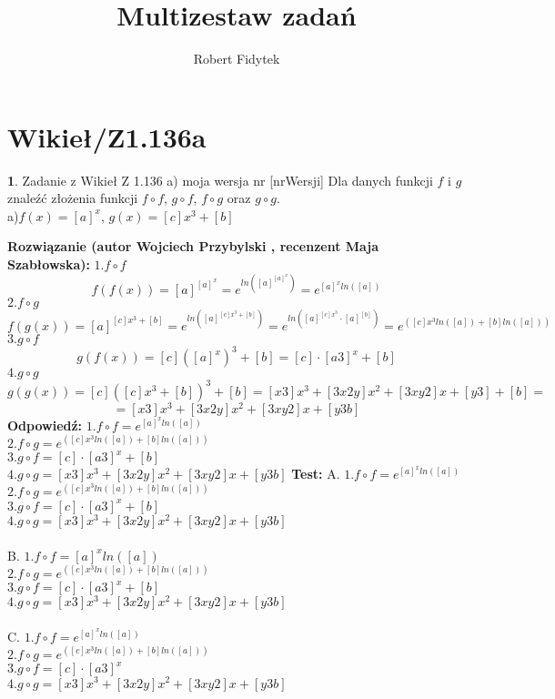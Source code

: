 \documentclass[12pt, a4paper]{article}
\title{Multizestaw zadań}
\author{Robert Fidytek}
\date{}
\theoremstyle{definition} %
\newtheorem{zad}{}
\newcommand{\kategoria}[1]{\section{#1}} %
\newcommand{\zadStart}[1]{\begin{zad}#1\newline} %
\newcommand{\zadStop}{\end{zad}}   %
\newcommand{\rozwStart}[2]{\noindent \textbf{Rozwiązanie (autor #1 , recenzent #2): }\newline} %
\newcommand{\rozwStop}{\newline}                                            %
\newcommand{\odpStart}{\noindent \textbf{Odpowiedź:}\newline}    %
\newcommand{\odpStop}{\newline}                                             %
\newcommand{\testStart}{\noindent \textbf{Test:}\newline} %
\begin{document}
\maketitle


\kategoria{Wikieł/Z1.136a}
\zadStart{Zadanie z Wikieł Z 1.136 a) moja wersja nr [nrWersji]}
Dla danych funkcji $f$ i $g$ znaleźć złożenia funkcji $f \circ f$, $g \circ f$, $f \circ g$ oraz $g \circ g$.\\
a)$f(x)=[a]^{x}$, $g(x)=[c]x^{3}+[b]$
\zadStop
\rozwStart{Wojciech Przybylski}{Maja Szabłowska}
$1. f \circ f$
$$f(f(x))=[a]^{[a]^{x}}=e^{ln([a]^{[a]^{x}})}=e^{[a]^{x}ln([a])}$$
$2. f \circ g$
$$f(g(x))=[a]^{[c]x^{3}+[b]}=e^{ln([a]^{[c]x^{3}+[b]})}=e^{ln([a]^{[c]x^{3}}\cdot[a]^{[b]})}=e^{([c]x^{3}ln([a])+[b]ln([a]))}$$
$3. g \circ f$
$$g(f(x))=[c]([a]^{x})^{3}+[b]=[c]\cdot[a3]^{x}+[b]$$
$4. g \circ g$
$$g(g(x))=[c]([c]x^{3}+[b])^{3}+[b]=[x3]x^{3}+[3x2y]x^{2}+[3xy2]x+[y3]+[b]=$$
$$=[x3]x^{3}+[3x2y]x^{2}+[3xy2]x+[y3b]$$
\rozwStop
\odpStart
$1. f \circ f = e^{[a]^{x}ln([a])}$\\
$2. f \circ g = e^{([c]x^{3}ln([a])+[b]ln([a]))}$\\
$3. g \circ f = [c]\cdot[a3]^{x}+[b]$\\
$4. g \circ g =[x3]x^{3}+[3x2y]x^{2}+[3xy2]x+[y3b] $
\odpStop
\testStart
A. $1. f \circ f = e^{[a]^{x}ln([a])}$\\
$2. f \circ g = e^{([c]x^{3}ln([a])+[b]ln([a]))}$\\
$3. g \circ f = [c]\cdot[a3]^{x}+[b]$\\
$4. g \circ g =[x3]x^{3}+[3x2y]x^{2}+[3xy2]x+[y3b] $\\
\\
B. $1. f \circ f = [a]^{x}ln([a])$\\
$2. f \circ g = e^{([c]x^{3}ln([a])+[b]ln([a]))}$\\
$3. g \circ f = [c]\cdot[a3]^{x}+[b]$\\
$4. g \circ g =[x3]x^{3}+[3x2y]x^{2}+[3xy2]x+[y3b] $\\
\\
C. $1. f \circ f = e^{[a]^{x}ln([a])}$\\
$2. f \circ g = e^{([c]x^{3}ln([a])+[b]ln([a]))}$\\
$3. g \circ f = [c]\cdot[a3]^{x}$\\
$4. g \circ g =[x3]x^{3}+[3x2y]x^{2}+[3xy2]x+[y3b] $\\
\end{document}
